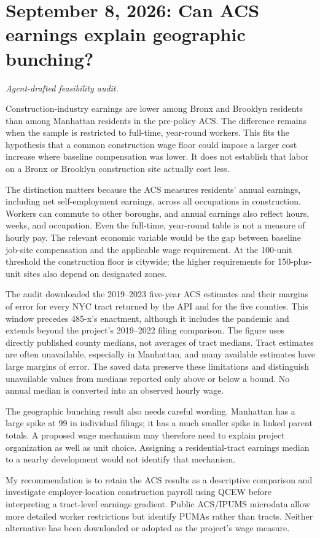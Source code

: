 \clearpage
\section*{September 8, 2026: Can ACS earnings explain geographic bunching?}
\textit{Agent-drafted feasibility audit.}

Construction-industry earnings are lower among Bronx and Brooklyn residents
than among Manhattan residents in the pre-policy ACS. The difference remains
when the sample is restricted to full-time, year-round workers. This fits the
hypothesis that a common construction wage floor could impose a larger cost
increase where baseline compensation was lower. It does not establish that
labor on a Bronx or Brooklyn construction site actually cost less.

The distinction matters because the ACS measures residents' annual earnings,
including net self-employment earnings, across all occupations in construction.
Workers can commute to other boroughs, and annual earnings also reflect hours,
weeks, and occupation. Even the full-time, year-round table is not a measure of
hourly pay. The relevant economic variable would be the gap between baseline
job-site compensation and the applicable wage requirement. At the 100-unit
threshold the construction floor is citywide; the higher requirements for
150-plus-unit sites also depend on designated zones.

The audit downloaded the 2019--2023 five-year ACS estimates and their margins
of error for every NYC tract returned by the API and for the five counties.
This window precedes 485-x's enactment, although it includes the pandemic and
extends beyond the project's 2019--2022 filing comparison. The figure uses
directly published county medians, not averages of tract medians. Tract
estimates are often unavailable, especially in Manhattan, and many available
estimates have large margins of error. The saved data preserve these limitations
and distinguish unavailable values from medians reported only above or below
a bound. No annual median is converted into an observed hourly wage.

The geographic bunching result also needs careful wording. Manhattan has a
large spike at 99 in individual filings; it has a much smaller spike in linked
parent totals. A proposed wage mechanism may therefore need to explain project
organization as well as unit choice. Assigning a residential-tract earnings
median to a nearby development would not identify that mechanism.

My recommendation is to retain the ACS results as a descriptive comparison
and investigate employer-location construction payroll using QCEW before
interpreting a tract-level earnings gradient. Public ACS/IPUMS microdata allow
more detailed worker restrictions but identify PUMAs rather than tracts.
Neither alternative has been downloaded or adopted as the project's wage
measure.

